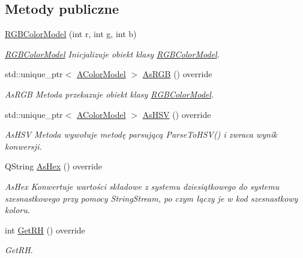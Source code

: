 \subsection*{Metody publiczne}
\begin{DoxyCompactItemize}
\item 
\mbox{\hyperlink{class_r_g_b_color_model_a60985479217d6c0f8dda2ec5d728a035}{R\+G\+B\+Color\+Model}} (int r, int g, int b)
\begin{DoxyCompactList}\small\item\em \mbox{\hyperlink{class_r_g_b_color_model}{R\+G\+B\+Color\+Model}} Inicjalizuje obiekt klasy \mbox{\hyperlink{class_r_g_b_color_model}{R\+G\+B\+Color\+Model}}. \end{DoxyCompactList}\item 
std\+::unique\+\_\+ptr$<$ \mbox{\hyperlink{class_a_color_model}{A\+Color\+Model}} $>$ \mbox{\hyperlink{class_r_g_b_color_model_a7619d529d6b0f94287221c813734244d}{As\+R\+GB}} () override
\begin{DoxyCompactList}\small\item\em As\+R\+GB Metoda przekazuje obiekt klasy \mbox{\hyperlink{class_r_g_b_color_model}{R\+G\+B\+Color\+Model}}. \end{DoxyCompactList}\item 
std\+::unique\+\_\+ptr$<$ \mbox{\hyperlink{class_a_color_model}{A\+Color\+Model}} $>$ \mbox{\hyperlink{class_r_g_b_color_model_a18d1b493d34f53ea4fdf9eaa066540c4}{As\+H\+SV}} () override
\begin{DoxyCompactList}\small\item\em As\+H\+SV Metoda wywołuje metodę parsującą Parse\+To\+H\+S\+V() i zwraca wynik konwersji. \end{DoxyCompactList}\item 
Q\+String \mbox{\hyperlink{class_r_g_b_color_model_ad1f82f637ab5b48c9e99b64270f38c54}{As\+Hex}} () override
\begin{DoxyCompactList}\small\item\em As\+Hex Konwertuje wartości składowe z systemu dziesiątkowego do systemu szesnastkowego przy pomocy String\+Stream, po czym łączy je w kod szesnastkowy koloru. \end{DoxyCompactList}\item 
int \mbox{\hyperlink{class_r_g_b_color_model_afd8f53b2cd42f3563db714978445a324}{Get\+RH}} () override
\begin{DoxyCompactList}\small\item\em Get\+RH. \end{DoxyCompactList}\item 

\end{DoxyCompactItemize}
